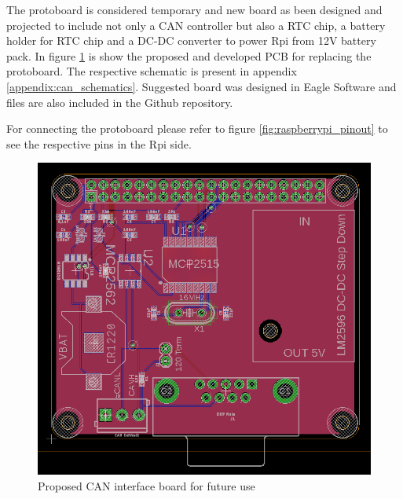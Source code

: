 The protoboard is considered temporary and new board as been designed and projected to include not only a \gls{CAN} controller but also a \gls{RTC} chip, a battery holder for \gls{RTC} chip and a DC-DC converter to power \gls{Rpi} from 12V battery pack. In figure \ref{fig:board_can} is show the proposed and developed \gls{PCB} for replacing the protoboard. The respective schematic is present in appendix \ref{appendix:can_schematics}. Suggested board was designed in Eagle Software and files are also included in the Github repository.

For connecting the protoboard please refer to figure \ref{fig:raspberrypi_pinout} to see the respective pins in the \gls{Rpi} side.

\begin{figure}[!hb]
	\centering
	\includegraphics[width=0.6\linewidth]{figures/Viena_Rpi_CAN_interface_board}
	\caption{Proposed CAN interface board for future use}
	\label{fig:board_can}
\end{figure}


